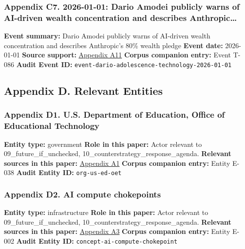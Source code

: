\documentclass[
  american,
  11pt,
  letterpaper,
]{article}
\begin{document}
\subsubsection{Appendix C7. 2026-01-01: Dario Amodei publicly warns of
AI-driven wealth concentration and describes
Anthropic\ldots{}}\label{appendix-c7-2026-01-01-dario-amodei-publicly-warns-of-ai-driven-wealth-concentration-and-describes-anthropic-s-80-wealth-pledge}

\textbf{Event summary:} Dario Amodei publicly warns of AI-driven wealth
concentration and describes Anthropic's 80\% wealth pledge \textbf{Event
date:} 2026-01-01 \textbf{Source support:}
\hyperref[appendix-a11-the-adolescence-of-technology]{Appendix A11}
\textbf{Corpus companion entry:} Event T-086 \textbf{Audit Event ID:}
\texttt{event-dario-adolescence-technology-2026-01-01}

\subsection{Appendix D. Relevant
Entities}\label{appendix-d.-relevant-entities}

\subsubsection{Appendix D1. U.S. Department of Education, Office of
Educational
Technology}\label{appendix-d1-u-s-department-of-education-office-of-educational-technology}

\textbf{Entity type:} government \textbf{Role in this paper:} Actor
relevant to 09\_future\_if\_unchecked,
10\_counterstrategy\_response\_agenda. \textbf{Relevant sources in this
paper:}
\hyperref[appendix-a1-artificial-intelligence-and-the-future-of-teaching-and-learning-insights-and-recommendations]{Appendix
A1} \textbf{Corpus companion entry:} Entity E-038 \textbf{Audit Entity
ID:} \texttt{org-us-ed-oet}

\subsubsection{Appendix D2. AI compute
chokepoints}\label{appendix-d2-ai-compute-chokepoints}

\textbf{Entity type:} infrastructure \textbf{Role in this paper:} Actor
relevant to 09\_future\_if\_unchecked,
10\_counterstrategy\_response\_agenda. \textbf{Relevant sources in this
paper:}
\hyperref[appendix-a3-computing-power-and-the-governance-of-artificial-intelligence]{Appendix
A3} \textbf{Corpus companion entry:} Entity E-002 \textbf{Audit Entity
ID:} \texttt{concept-ai-compute-chokepoint}
\end{document}
